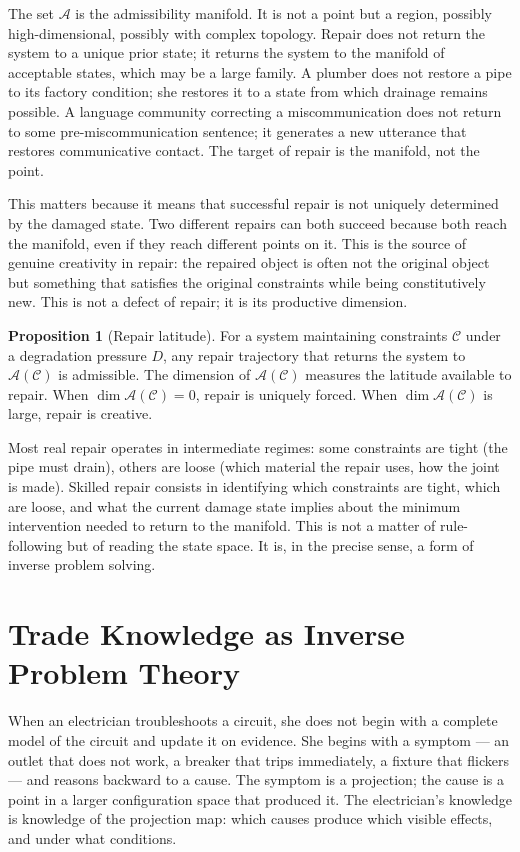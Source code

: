 \documentclass[11pt, a4paper]{article}
\theoremstyle{definition}
\newtheorem{proposition}{Proposition}
\theoremstyle{remark}
\begin{document}
The set $\mathcal{A}$ is the admissibility manifold. It is not a point but a
region, possibly high-dimensional, possibly with complex topology. Repair does
not return the system to a unique prior state; it returns the system to the
manifold of acceptable states, which may be a large family. A plumber does not
restore a pipe to its factory condition; she restores it to a state from which
drainage remains possible. A language community correcting a miscommunication
does not return to some pre-miscommunication sentence; it generates a new
utterance that restores communicative contact. The target of repair is the
manifold, not the point.

This matters because it means that successful repair is not uniquely determined
by the damaged state. Two different repairs can both succeed because both reach
the manifold, even if they reach different points on it. This is the source of
genuine creativity in repair: the repaired object is often not the original
object but something that satisfies the original constraints while being
constitutively new. This is not a defect of repair; it is its productive
dimension.

\begin{proposition}[Repair latitude]
For a system maintaining constraints $\mathcal{C}$ under a degradation
pressure $D$, any repair trajectory that returns the system to
$\mathcal{A}(\mathcal{C})$ is admissible. The dimension of
$\mathcal{A}(\mathcal{C})$ measures the latitude available to repair.
When $\dim \mathcal{A}(\mathcal{C}) = 0$, repair is uniquely forced.
When $\dim \mathcal{A}(\mathcal{C})$ is large, repair is creative.
\end{proposition}

Most real repair operates in intermediate regimes: some constraints are tight
(the pipe must drain), others are loose (which material the repair uses, how
the joint is made). Skilled repair consists in identifying which constraints
are tight, which are loose, and what the current damage state implies about
the minimum intervention needed to return to the manifold. This is not a matter
of rule-following but of reading the state space. It is, in the precise sense,
a form of inverse problem solving.

\section{Trade Knowledge as Inverse Problem Theory}

When an electrician troubleshoots a circuit, she does not begin with a complete
model of the circuit and update it on evidence. She begins with a symptom ---
an outlet that does not work, a breaker that trips immediately, a fixture that
flickers --- and reasons backward to a cause. The symptom is a projection; the
cause is a point in a larger configuration space that produced it. The
electrician's knowledge is knowledge of the projection map: which causes produce
which visible effects, and under what conditions.
\end{document}
